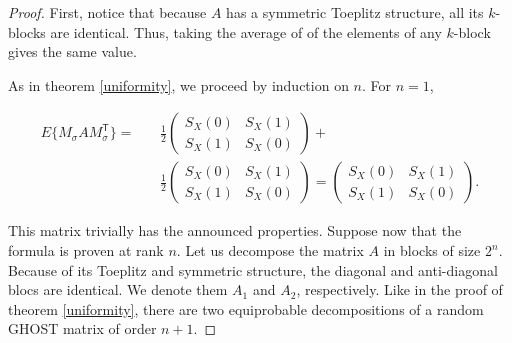 \documentclass[12pt]{article}
\begin{document}
  \begin{proof}

  First, notice that because $A$ has a symmetric Toeplitz structure,
  all its $k$-blocks are identical. Thus, taking the average of
  of the elements of any $k$-block gives the same value.

  As in theorem \ref{uniformity}, we proceed by induction on $n$.
  For $n = 1$,

  \begin{eqnarray*}
    E\{M_\sigma A M_\sigma^\mathsf{T}\} = 
    &\,& \frac{1}{2} \left( \begin{array}{cc}
      S_X(0) & S_X(1) \\
      S_X(1) & S_X(0)
    \end{array} \right) + \\
    &\,& \frac{1}{2} \left( \begin{array}{cc}
      S_X(0) & S_X(1) \\
      S_X(1) & S_X(0)
    \end{array} \right) = 
    \left( \begin{array}{cc}
      S_X(0) & S_X(1) \\
      S_X(1) & S_X(0)
    \end{array} \right).
  \end{eqnarray*}

  This matrix trivially has the announced properties.
  Suppose now that the formula is proven at rank $n$.
  Let us decompose the matrix $A$ in blocks of
  size $2^n$. Because of its Toeplitz and symmetric structure,
  the diagonal and anti-diagonal blocs are identical. We denote
  them $A_1$ and $A_2$, respectively. Like in the proof of 
  theorem \ref{uniformity}, there are two equiprobable
  decompositions of a random GHOST matrix of order $n+1$.


\end{proof}
\end{document}
